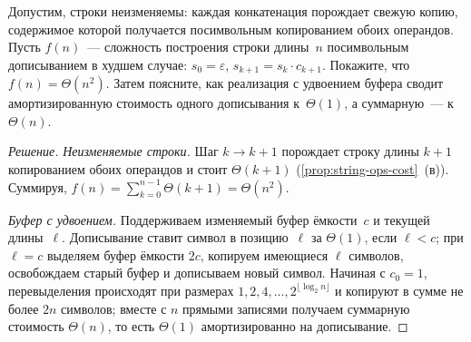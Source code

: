 \begin{problem}
\label{prob:concat-cost}
Допустим, строки неизменяемы: каждая конкатенация порождает свежую
копию, содержимое которой получается посимвольным копированием обоих
операндов. Пусть $f(n)$~--- сложность построения строки длины~$n$
посимвольным дописыванием в худшем случае:
$s_0 = \varepsilon$, $s_{k+1} = s_k \cdot c_{k+1}$. Покажите, что
$f(n) = \Theta(n^2)$. Затем поясните, как реализация с удвоением
буфера сводит амортизированную стоимость одного дописывания
к~$\Theta(1)$, а суммарную~--- к~$\Theta(n)$.
\end{problem}

\begin{proof}[Решение]
\emph{Неизменяемые строки.} Шаг $k \to k + 1$ порождает строку
длины $k + 1$ копированием обоих операндов и стоит $\Theta(k + 1)$
(\cref{prop:string-ops-cost}~(в)). Суммируя,
$f(n) = \sum_{k=0}^{n-1} \Theta(k + 1) = \Theta(n^2)$.

\emph{Буфер с удвоением.} Поддерживаем изменяемый буфер ёмкости~$c$
и текущей длины~$\ell$. Дописывание ставит символ в позицию~$\ell$
за $\Theta(1)$, если $\ell < c$; при $\ell = c$ выделяем буфер
ёмкости $2c$, копируем имеющиеся $\ell$ символов, освобождаем старый
буфер и дописываем новый символ. Начиная с $c_0 = 1$, перевыделения
происходят при размерах $1, 2, 4, \dots, 2^{\lfloor \log_2 n \rfloor}$
и копируют в сумме не более $2n$ символов; вместе с $n$ прямыми
записями получаем суммарную стоимость $\Theta(n)$, то есть $\Theta(1)$
амортизированно на дописывание.
\end{proof}
